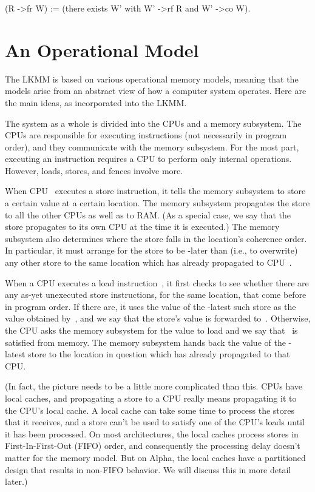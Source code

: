 \begin{VerbatimU}
	(R ->fr W) := (there exists W' with W' ->rf R and W' ->co W).
\end{VerbatimU}


\section{An Operational Model}
\label{sec:docs:explanation:An Operational Model}

The LKMM is based on various operational memory models, meaning that
the models arise from an abstract view of how a computer system
operates.
Here are the main ideas, as incorporated into the LKMM\@.

The system as a whole is divided into the CPUs and a memory subsystem.
The CPUs are responsible for executing instructions (not necessarily
in program order), and they communicate with the memory subsystem.
For the most part, executing an instruction requires a CPU to perform
only internal operations.
However, loads, stores, and fences involve more.

When CPU~ executes a store instruction, it tells the memory subsystem
to store a certain value at a certain location.
The memory subsystem propagates the store to all the other CPUs as well
as to RAM\@.
(As a special case, we say that the store propagates to its own CPU at the
time it is executed.)
The memory subsystem also determines where the store falls in the
location's coherence order.
In particular, it must arrange for the store to be -later than
(i.e., to overwrite) any other store to the same location which has
already propagated to CPU~.

When a CPU executes a load instruction~, it first checks to see
whether there are any as-yet unexecuted store instructions,
for the same location, that come before~ in program order.
If there are, it uses the value of the -latest such store as
the value obtained by~, and we say that the store's value is
forwarded to~.
Otherwise, the CPU asks the memory subsystem for the value to load
and we say that~ is satisfied from memory.
The memory subsystem hands back the value of the -latest store
to the location in question which has already propagated to that CPU\@.

(In fact, the picture needs to be a little more complicated than this.
CPUs have local caches, and propagating a store to a CPU really means
propagating it to the CPU's local cache.
A local cache can take some time to process the stores that it
receives, and a store can't be used to satisfy one of the CPU's loads
until it has been processed.
On most architectures, the local caches process stores in
First-In-First-Out (FIFO) order, and consequently the processing delay
doesn't matter for the memory model.
But on Alpha, the local caches have a partitioned design that results
in non-FIFO behavior.  We will discuss this in more detail later.)

